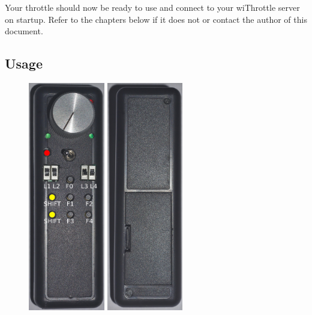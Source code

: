\documentclass[11pt,a4paper]{scrartcl}
\begin{document}
Your throttle should now be ready to use and connect to your wiThrottle server on startup. Refer to the chapters below if it does not or contact the author of this document.

\subsection{Usage}

\begin{figure}[tbh]  
  \centering
  \includegraphics[height=100mm]{images/throttle_Front}
  \hspace{1em}
  \includegraphics[height=100mm]{images/throttle_Back}
  \hspace{1em}

\end{figure}
\end{document}
